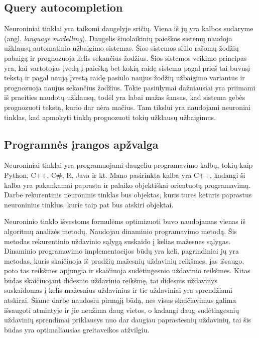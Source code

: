 \subsection{Query autocompletion}

Neuroniniai tinklai yra taikomi daugelyje sričių. Viena iš jų yra kalbos sudaryme (angl. \textit{language modelling}). Daugelis šiuolaikinių paieškos sistemų naudoja užklausų automatinio užbaigimo sistemas. Šios sistemos siūlo rašomų žodžių pabaigą ir prognozuoja kelis sekančius žodžius. Šios sistemos veikimo principas yra, kai vartotojas įvedą į paiešką bet kokią raidę sistema pagal prieš tai buvusį tekstą ir pagal naują įvestą raidę pasiūlo naujus žodžių užbaigimo variantus ir prognozuoja naujus sekančius žodžius. Tokie pasiūlymai dažniausiai yra priimami iš praeities naudotų užklausų, todėl yra labai mažas šansas, kad sistema gebės prognozuoti tekstą, kurio dar nėra mačius. Tam tikslui yra naudojami neuroniai tinklas, kad apmokyti tinklą prognozuoti tokių užklausų užbaigimus.\cite{park2017}



\subsection{Programnės įrangos apžvalga}


Neuroniniai tinklai yra programuojami daugeliu programavimo kalbų, tokių kaip Python, C++, C\#, R, Java ir kt. Mano pasirinkta kalba yra C++, kadangi ši kalba yra pakankamai paprasta ir palaiko objektiškai orientuotą programavimą. Darbe rekurentinis neuroninis tinklas bus objektas, kuris turės keturis paprastus neuroninius tinklus, kurie taip pat bus atskiri objektai.

Neuroninio tinklo išvestoms formulėms optimizuoti buvo naudojamas vienas iš algoritmų analizės metodų. Naudojau dinaminio programavimo metodą. Šis metodas rekurentinio uždavinio sąlygą suskaido į kelias mažesnes sąlygas. Dinaminio programavimo implementacijos būdų yra keli, pagrindiniai jų yra metodas, kuris skaičiuoja iš pradžių mažesnių uždavinių reikšmes, jas išsaugo, poto tas reikšmes apjungia ir skaičiuoja sudėtingesnio uždavinio reikšmes. Kitas būdas skaičiuojant didesnio uždavinio reikšmę, tai didesnis uždavinys suskaidomas į kelis mažesnius uždavinius ir tie uždaviniai yra sprendžiami atskirai. Šiame darbe naudosiu pirmąjį būdą, nes visus skaičiavimus galima išsaugoti atmintyje ir jie neužima daug vietos, o kadangi daug sudėtingesnių uždavinių sprendimai priklausys nuo dar daugiau paprastesnių uždavinių, tai šis būdas yra optimaliausias greitaveikos atžvilgiu. \cite{Robinett2005}

